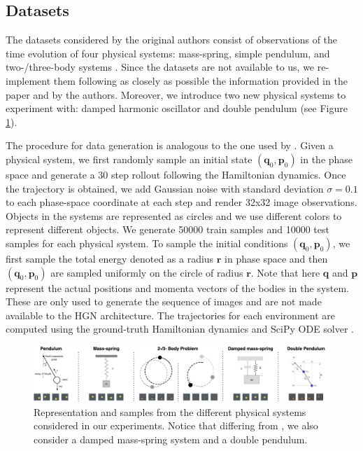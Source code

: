 \subsection{Datasets} \label{sec:data}

The datasets considered by the original authors consist of observations of the time evolution of four physical systems: mass-spring, simple pendulum, and two-/three-body systems \cite{hgn}. Since the datasets are not available to us, we re-implement them following as closely as possible the information provided in the paper and by the authors. Moreover, we introduce two new physical systems to experiment with: damped harmonic oscillator and double pendulum (see Figure \ref{fig:datasets}).

The procedure for data generation is analogous to the one used by \cite{hnn}. Given a physical system, we first randomly sample an initial state $(\bm{q}_0, \bm{p}_0)$ in the phase space and generate a $30$ step rollout following the Hamiltonian dynamics. Once the trajectory is obtained, we add Gaussian noise with standard deviation $\sigma = 0.1$ to each phase-space coordinate at each step and render 32x32 image observations. Objects in the systems are represented as circles and we use different colors to represent different objects. We generate 50000 train samples and 10000 test samples for each physical system. To sample the initial conditions $(\bm{q}_0, \bm{p}_0)$, we first sample the total energy denoted as a radius $\bm{r}$ in phase space and then $(\bm{q}_0, \bm{p}_0)$ are sampled uniformly on the circle of radius $\bm{r}$. Note that here $\bm{q}$ and $\bm{p}$ represent the actual positions and momenta vectors of the bodies in the system. These are only used to generate the sequence of images and are not made available to the HGN architecture. The trajectories for each environment are computed using the ground-truth Hamiltonian dynamics and SciPy ODE solver \cite{scipy}.

\begin{figure}
    \centering
    \includegraphics[width=\textwidth]{pictures/data/new_dataset_image.png}
    \caption{Representation and samples from the different physical systems considered in our experiments. Notice that differing from \cite{hgn}, we also consider a damped mass-spring system and a double pendulum.}
    \label{fig:datasets}
\end{figure}
